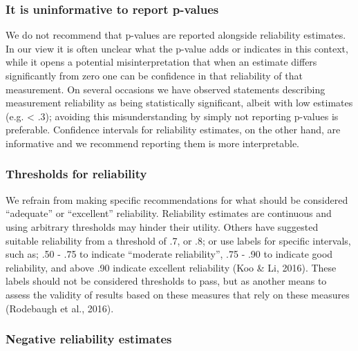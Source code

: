 \documentclass[english,,man,floatsintext]{apa6}
\begin{document}
\hypertarget{it-is-uninformative-to-report-p-values}{%
\subsubsection{It is uninformative to report p-values}\label{it-is-uninformative-to-report-p-values}}

We do not recommend that p-values are reported alongside reliability estimates. In our view it is often unclear what the p-value adds or indicates in this context, while it opens a potential misinterpretation that when an estimate differs significantly from zero one can be confidence in that reliability of that measurement. On several occasions we have observed statements describing measurement reliability as being statistically significant, albeit with low estimates (e.g. \textless{} .3); avoiding this misunderstanding by simply not reporting p-values is preferable. Confidence intervals for reliability estimates, on the other hand, are informative and we recommend reporting them is more interpretable.

\hypertarget{thresholds-for-reliability}{%
\subsubsection{Thresholds for reliability}\label{thresholds-for-reliability}}

We refrain from making specific recommendations for what should be considered \enquote{adequate} or \enquote{excellent} reliability. Reliability estimates are continuous and using arbitrary thresholds may hinder their utility. Others have suggested suitable reliability from a threshold of .7, or .8; or use labels for specific intervals, such as; .50 - .75 to indicate \enquote{moderate reliability}, .75 - .90 to indicate good reliability, and above .90 indicate excellent reliability (Koo \& Li, 2016). These labels should not be considered thresholds to pass, but as another means to assess the validity of results based on these measures that rely on these measures (Rodebaugh et al., 2016).

\hypertarget{negative-reliability-estimates}{%
\subsubsection{Negative reliability estimates}\label{negative-reliability-estimates}}
\end{document}
